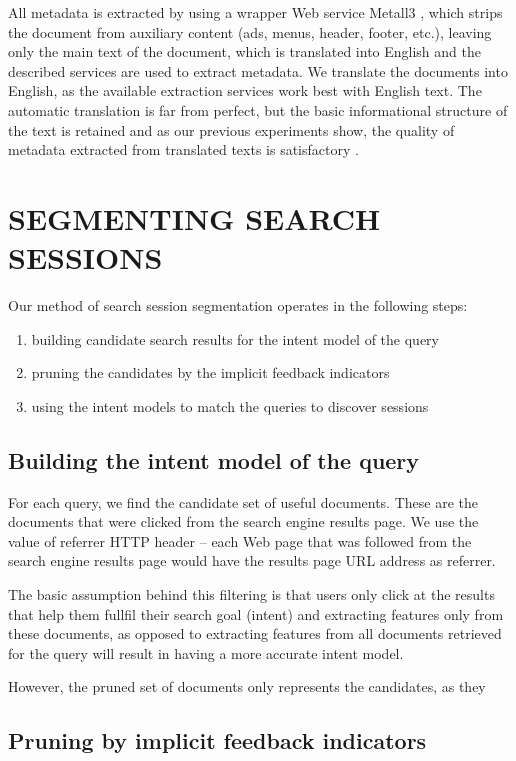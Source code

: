 \documentclass{acm_proc_article-sp} %
\begin{document}
All metadata is extracted by using a wrapper Web service
Metall3
, which strips the document from auxiliary content
(ads, menus, header, footer, etc.), leaving only the main text
of the document, which is translated into English and the
described services are used to extract metadata. We translate
the documents into English, as the available extraction
services work best with English text. The automatic translation
is far from perfect, but the basic informational structure
of the text is retained and as our previous experiments show,
the quality of metadata extracted from translated texts is
satisfactory \cite{Barla:2}.

\section{SEGMENTING SEARCH SESSIONS}

Our method of search session segmentation operates in the
following steps:

\begin{enumerate} 
	\item building candidate search results for the intent model
	of the query
	\item pruning the candidates by the implicit feedback indicators
	\item using the intent models to match the queries to discover
	sessions
\end{enumerate}

\subsection{Building the intent model of the query}

For each query, we find the candidate set of useful documents.
These are the documents that were clicked from the
search engine results page. We use the value of referrer
HTTP header – each Web page that was followed from the
search engine results page would have the results page URL
address as referrer.

The basic assumption behind this filtering is that users only
click at the results that help them fullfil their search goal (intent)
and extracting features only from these documents, as
opposed to extracting features from all documents retrieved
for the query will result in having a more accurate intent
model.

However, the pruned set of documents only represents the
candidates, as they

\subsection{Pruning by implicit feedback indicators}
\end{document}
